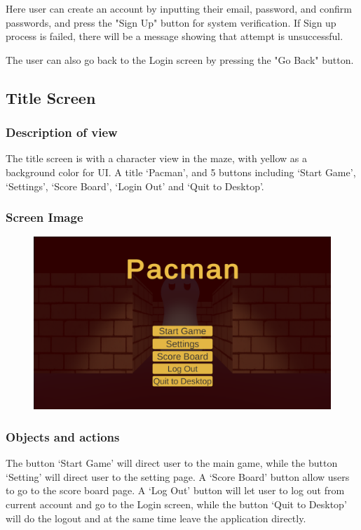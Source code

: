 \documentclass[11pt]{article}
\begin{document}
Here user can create an account by inputting their email, password, and confirm passwords, and press the "Sign Up" button for system verification. If Sign up process is failed, there will be a message showing that attempt is unsuccessful.

The user can also go back to the Login screen by pressing the "Go Back" button.

\subsection{Title Screen}
\subsubsection{Description of view}
The title screen is with a character view in the maze, with yellow as a background color for UI. A title `Pacman', and 5 buttons including `Start Game', `Settings', `Score Board', `Login Out' and `Quit to Desktop'. 
\subsubsection{Screen Image}
\begin{figure}[H]
    \centering
    \includegraphics*[scale=0.2]{UI1.0Main.png}
\end{figure}
\subsubsection{Objects and actions}
The button `Start Game' will direct user to the main game, while the button `Setting' will direct user to the setting page. A `Score Board' button allow users to go to the score board page. A `Log Out' button will let user to log out from current account and go to the Login screen, while the button `Quit to Desktop' will do the logout and at the same time leave the application directly.
\end{document}
